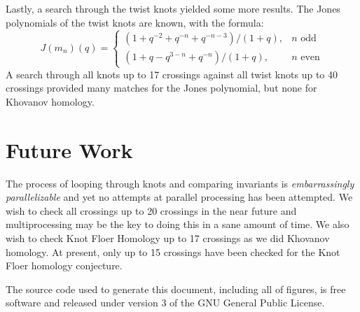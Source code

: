 \documentclass{article}
\theoremstyle{plain}
\begin{document}
        Lastly, a search through the twist knots yielded some more results.
        The Jones polynomials of the twist knots are known, with the formula:
        \begin{equation}
            J(m_{n})(q)=
            \begin{cases}
                (1+q^{-2}+q^{-n}+q^{-n-3})/(1+q),&n\textrm{ odd}\\
                (1+q-q^{3-n}+q^{-n})/(1+q),&n\textrm{ even}
            \end{cases}
        \end{equation}
        A search through all knots up to 17 crossings against all twist knots
        up to 40 crossings provided many matches for the Jones polynomial, but
        none for Khovanov homology.
    \section{Future Work}
        The process of looping through knots and comparing invariants is
        \textit{embarrassingly parallelizable} and yet no attempts at
        parallel processing has been attempted. We wish to check all crossings
        up to 20 crossings in the near future and multiprocessing may be the
        key to doing this in a sane amount of time. We also wish to check
        Knot Floer Homology up to 17 crossings as we did Khovanov homology.
        At present, only up to 15 crossings have been checked for the Knot
        Floer homology conjecture.
    \newpage
    
    
    \newpage
    The source code used to generate this document, including all of figures,
    is free software and released under version 3 of the GNU General Public
    License.
\end{document}
